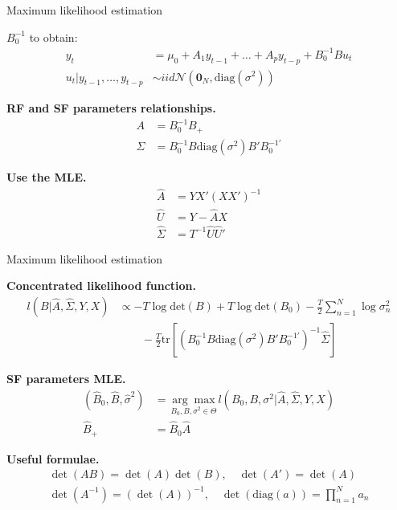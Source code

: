 \documentclass[notes,blackandwhite,mathsans,usenames,dvipsnames]{beamer}
\begin{document}
\begin{frame}{Maximum likelihood estimation}

 $B_0^{-1}$ {\color{mcxs2}to obtain:}\small
\begin{align*}
y_{t} &= \mu_0 + A_1 y_{t-1} + \dots + A_p y_{t-p} + B_0^{-1}B u_t\\
u_t|y_{t-1}, \dots, y_{t-p} &\sim iid \mathcal{N}\left( \mathbf{0}_N, \text{diag}\left(\sigma^2\right) \right)
\end{align*}

\bigskip\normalsize\textbf{RF and SF parameters relationships.}\small
\begin{align*}
A &= B_0^{-1}B_+\\
\Sigma &= B_0^{-1}B \text{diag}\left(\sigma^2\right) B'B_0^{-1\prime}
\end{align*}

\bigskip\normalsize\textbf{Use the MLE.}\small
\begin{align*}
\widehat{A} &= YX' (XX')^{-1}\\
\widehat{U}&=Y-\widehat{A}X\\
\widehat\Sigma &= T^{-1}\widehat{U}\widehat{U}'
\end{align*}


\end{frame}




\begin{frame}{Maximum likelihood estimation}

\bigskip\normalsize\textbf{Concentrated likelihood function.}\small
\begin{align*}
l(B|\widehat{A},\widehat\Sigma,Y,X) &\propto -T\log\text{det}\left( B\right) +T\log\text{det}\left( B_0\right) -\frac{T}{2}\sum_{n=1}^N\log\sigma_n^2\\
&\qquad  -\frac{T}{2}\text{tr}\left[ \left(B_0^{-1}B \text{diag}\left(\sigma^2\right) B'B_0^{-1\prime}\right)^{-1}\widehat\Sigma \right]
\end{align*}

\bigskip\normalsize\textbf{SF parameters MLE.}\small
\begin{align*}
\left(\widehat{B}_0,\widehat{B},\widehat\sigma^2\right) &= \underset{B_0,B,\sigma^2\in\Theta}{\arg\max} l(B_0,B,\sigma^2|\widehat{A},\widehat\Sigma,Y,X)\\
\widehat{B}_+ &= \widehat{B}_0 \widehat{A}
\end{align*}

\bigskip\normalsize\textbf{Useful formulae.}\footnotesize
\begin{align*}
\det(AB) = \det(A)\det(B), \quad \det(A') = \det(A)\\ 
\det\left(A^{-1}\right) = \left(\det(A)\right)^{-1}, \quad \det(\text{diag}(a)) = \prod_{n=1}^N a_n
\end{align*}


\end{frame}
\end{document}

